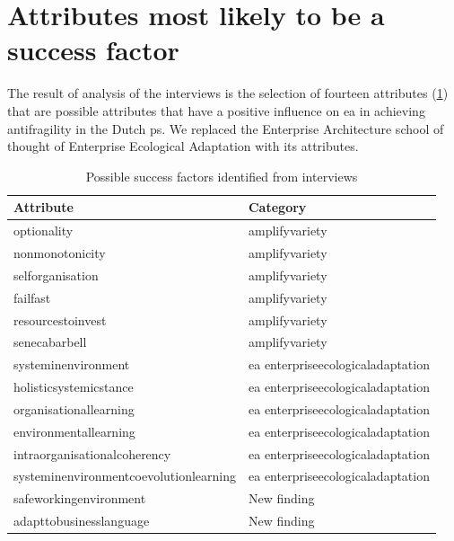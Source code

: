 \section{Attributes most likely to be a success factor}
\label{sec:attributeslikelysf}
The result of analysis of the interviews is the selection of fourteen attributes (\cref{tab:interviewpossiblesf}) that are possible attributes that have a positive influence on \acrlong{ea} in achieving \gls{antifragility} in the Dutch \gls{ps}. We replaced the Enterprise Architecture school of thought of Enterprise Ecological Adaptation with its \glspl{attribute}.
\begin{longtable}{@{}ll@{}}
	\toprule%
	\textbf{Attribute} & \textbf{Category}  \\%
	\midrule%
	\endhead%
	\hline
	\endfoot%
	\caption[Possible success factors identified from interviews]{Possible success factors identified from interviews}
	\label{tab:interviewpossiblesf}
	\endlastfoot%
	\Gls{optionality} & \Gls{amplifyvariety} \\%
	\Gls{nonmonotonicity} & \Gls{amplifyvariety} \\%
	\Gls{selforganisation} & \Gls{amplifyvariety} \\%
	\Gls{failfast} & \Gls{amplifyvariety} \\%
	\Gls{resourcestoinvest} & \Gls{amplifyvariety} \\%
	\Gls{senecabarbell} & \Gls{amplifyvariety} \\%
	\Gls{systeminenvironment} & \acrshort{ea} \Gls{enterpriseecologicaladaptation} \\%
	\Gls{holisticsystemicstance} & \acrshort{ea} \Gls{enterpriseecologicaladaptation} \\%
	\Gls{organisationallearning} & \acrshort{ea} \Gls{enterpriseecologicaladaptation} \\%
	\Gls{environmentallearning} & \acrshort{ea} \Gls{enterpriseecologicaladaptation} \\%
	\Gls{intraorganisationalcoherency} & \acrshort{ea} \Gls{enterpriseecologicaladaptation} \\%
	\Gls{systeminenvironmentcoevolutionlearning} & \acrshort{ea} \Gls{enterpriseecologicaladaptation} \\%
	\Gls{safeworkingenvironment} & New finding \\%
	\Gls{adapttobusinesslanguage} & New finding \\%
	\bottomrule%
\end{longtable}%

